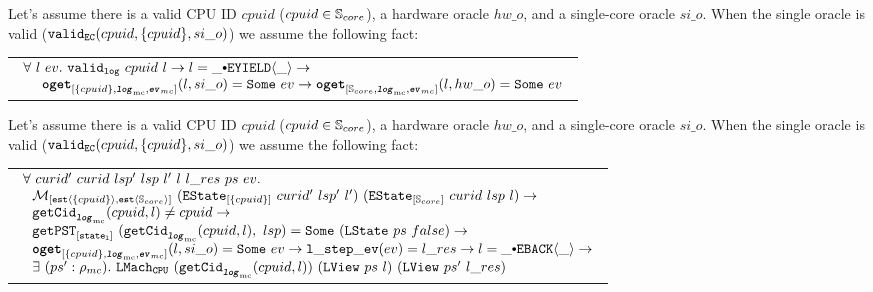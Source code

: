 \begin{hypothesis}
\label{hypothesis:chapter:conlink:related-single-oracle-hw-oracle}
Let's assume  there is a valid CPU ID $cpuid$
($cpuid \in {\mathbb{S}_{core}}$),  a hardware oracle $hw\_o$,
and a single-core oracle $si\_o$.
When the single oracle is valid ($ {{\mathrm{\texttt{valid}}}_{{\mathrm{\texttt{EC}}}}}({cpuid}, {\{cpuid\}}, {si\_o})$) we assume the following fact:
\begin{center}
\begin{tabular}{P{0.95\textwidth}}
$
\begin{array}{l}
\forall \ l \ ev  . \ \validlog{cpuid}{l} \rightarrow l = \listconsoppo{\yieldev{\_}}{\_} \rightarrow\\
\ \ \ \ \oget{\set{cpuid}}{\mclog}{\mcevent}{l}{si\_o}{ev} \rightarrow \oget{\coreset}{\mclog}{\mcevent}{l}{hw\_o}{ev} \\
\end{array}
$
\end{tabular}
\end{center}
\end{hypothesis}


\begin{hypothesis}
\label{hypothesis:chapter:conlink:related-single-oracle-concrete-step}
Let's assume  there is a valid CPU ID $cpuid$ ($cpuid \in {\mathbb{S}_{core}}$),  a hardware oracle $hw\_o$,
and a single-core oracle $si\_o$.
When the single oracle is valid ($ {{\mathrm{\texttt{valid}}}_{{\mathrm{\texttt{EC}}}}}({cpuid}, {\{cpuid\}}, {si\_o})$) we assume the following fact:
\begin{center}
\begin{tabular}{P{0.95\textwidth}}
$
\begin{array}{l}
\forall \ curid' \ curid \ lsp' \ lsp \ l' \ l \ l\_res \ ps \ ev . \\
\ \ \matchestateestate{\set{cpuid}}{(\envstate{\set{cpuid}}{curid'}{lsp'}{l'})}{(\envstate{\coreset}{curid}{lsp}{l})} \rightarrow\\
\ \ \getcuridfromlognoeq{cpuid}{l} \neq cpuid \rightarrow \\
\ \ \getpstsome{\localstatekwd}{\getcuridfromlognoeq{cpuid}{l}}{lsp}{(\localstate{ps}{false})} \rightarrow \\
\ \ \oget{\set{cpuid}}{\mclog}{\mcevent}{l}{si\_o}{ev} \rightarrow \localstepev{ev}{l\_res} \rightarrow l = \listconsoppo{\yieldbackev{\_}}{\_} \rightarrow \\
\ \ \exists\ (ps' : \privatestate) . \ \hardwarelocalstep{(\getcuridfromlognoeq{cpuid}{l})}{(\localview{ps}{l})}{(\localview{ps'}{l\_res})} \\
\end{array}
$
\end{tabular}
\end{center}
\end{hypothesis}


